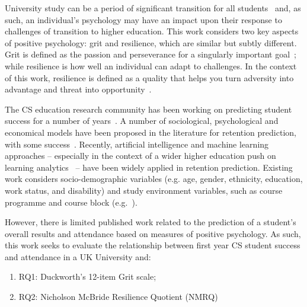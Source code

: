 \documentclass[sigconf]{acmart}
\begin{document}
University study can be a period of significant transition for all students~\cite{Tinto1975} and, as such, an individual's psychology may have an impact upon their response to challenges of transition to higher education. This work considers two key aspects of positive psychology: grit and resilience, which are similar but subtly different. Grit is defined as the passion and perseverance for a singularly important goal~\cite{Duckworth2016}; while resilience is how well an individual can adapt to challenges. In the context of this work, resilience is defined as a quality that helps you turn adversity into advantage and threat into opportunity~\cite{Clarke2010}.  

The CS education research community has been working on predicting student success for a number of years~\cite{Robins2010}. A number of sociological, psychological and economical models have been proposed in the literature for retention prediction, with some success~\cite{Seidman2012}. Recently, artificial intelligence and machine learning approaches -- especially in the context of a wider higher education push on learning analytics~\cite{jiscla:2020} -- have been widely applied in retention prediction. Existing work considers socio-demographic variables (e.g. age, gender, ethnicity, education, work status, and disability) and study environment variables, such as course programme and course block (e.g.~\cite{Kovaci2012,Liao:2019:EVD:3287324.3287407}).

 However, there is limited published work related to the prediction of a student's overall results and attendance based on measures of positive psychology. As such, this work seeks to evaluate the relationship between first year CS student success and attendance in a UK University and:
\begin{enumerate}
    \item RQ1: Duckworth's 12-item Grit scale;
    \item RQ2: Nicholson McBride Resilience Quotient (NMRQ)
\end{enumerate}
\end{document}
